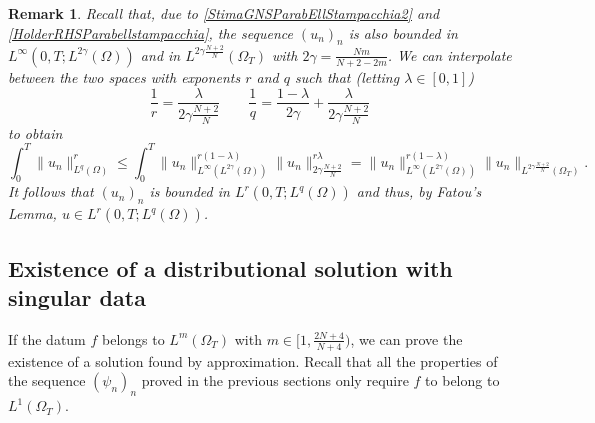 \documentclass{amsart}
\numberwithin{equation}{section}
\newtheorem{remark}[example]{Remark}
\def\elle#1{L^{#1}}
\def\elleom#1{L^{#1}(\Omega)}
\def\elleomT#1{L^{#1}(\Omega_T)}
\def\norma#1#2{ \|#1 \|_{#2}}
\begin{document}
\begin{remark}
    Recall that, due to \eqref{StimaGNSParabEllStampacchia2} and \eqref{HolderRHSParabellstampacchia}, the sequence $(u_n)_n$ is also bounded in $\elle\infty(0,T;\elleom {2\gamma})$ and in $\elleomT{2\gamma\frac{N+2}{N}}$ with $2\gamma=\frac{Nm}{N+2-2m}$. We can interpolate between the two spaces with exponents $r$ and $q$ such that (letting $\lambda\in[0,1]$)
    $$\frac{1}{r}=\frac{\lambda}{2\gamma\frac{N+2}{N}}\quad\quad \frac{1}{q}=\frac{1-\lambda}{2\gamma}+\frac{\lambda}{2\gamma\frac{N+2}{N}}$$
    to obtain
    $$\int_0^T \norma{u_n}{\elleom q}^r
    \leq 
    \int_0^T\norma{u_n}{\elle\infty(\elleom {2\gamma})}^{r(1-\lambda)}\norma{u_n}{2\gamma\frac{N+2}{N}}^{r\lambda}
    =\norma{u_n}{\elle\infty(\elleom {2\gamma})}^{r(1-\lambda)}\norma {u_n}{\elleomT{2\gamma\frac{N+2}{N}}}.$$
    It follows that $(u_n)_n$ is bounded in $\elle r(0,T;\elleom q)$ and thus, by Fatou's Lemma, $u\in \elle r(0,T;\elleom q)$.
\end{remark}


\subsection{Existence of a distributional solution with singular data}\label{sec:distrib_sol}

If the datum $f$ belongs to $\elleomT m$ with $m\in[1,\frac{2N+4}{N+4})$, we can prove the existence of a solution found by approximation. Recall that all the properties of the sequence $(\psi_n)_n$ proved in the previous sections only require $f$ to belong to $\elleomT1$.
\end{document}
